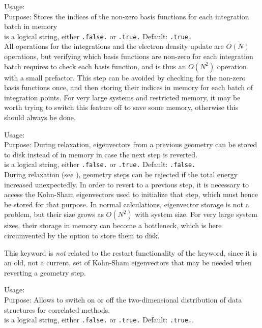 {
  \noindent
  Usage:   \\[1.0ex]
  Purpose: Stores the indices of the non-zero basis functions for
    each integration batch in memory \\[1.0ex]
   is a logical string, either \texttt{.false.} or
  \texttt{.true.} Default: \texttt{.true.} \\
}
All operations for the integrations and the electron density update
are $O(N)$ operations, but verifying which basis functions are
non-zero for each integration batch requires to check each basis
function, and is thus an $O(N^2)$ operation with a small
prefactor. This step can be avoided by checking for the non-zero basis
functions once, and then storing their indices in memory for each
batch of integration points. For very large systems and restricted
memory, it may be worth trying to switch this feature off to save some
memory, otherwise this should always be done. 


{
  \noindent
  Usage:   \\[1.0ex]
  Purpose: During relaxation, eigenvectors from a previous geometry
    can be stored to disk instead of in memory in case the next step
    is reverted. \\[1.0ex]
   is a logical string, either \texttt{.false.} or
    \texttt{.true.} Default: \texttt{.false.} \\  
}
During relaxation (see ), geometry steps can
be rejected if the total energy increased unexpectedly. In order to
revert to a previous step, it is necessary to access the 
Kohn-Sham eigenvectors used to initialize that step, which must hence
be stored for that purpose. In normal calculations, eigenvector
storage is not a problem, but their size grows as $O(N^2)$ with system
size. For very large system sizes, their storage in memory can become
a bottleneck, which is here circumvented by the option to store them
to disk.

This keyword is \emph{not} related to the restart functionality of the
 keyword, since it is an old, not a current, set of
Kohn-Sham eigenvectors that may be needed when reverting a geometry step.

{
  \noindent
  Usage:   \\[1.0ex]
  Purpose: Allows to switch on or off the two-dimensional distribution of data
  structures for correlated methods.\\[1.0ex]
   is a logical string, either \texttt{.false.} or
  \texttt{.true.} Default: \texttt{.true.}.\\
}

